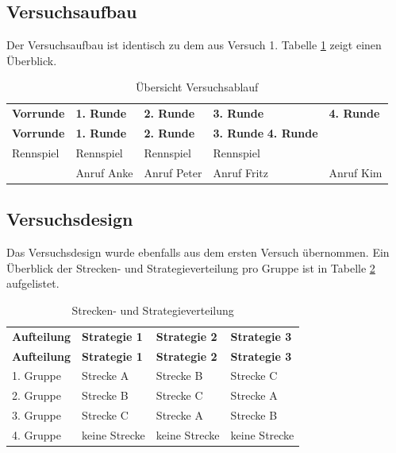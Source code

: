 \documentclass[12pt,a4paper]{scrartcl}
\begin{document}
\subsection{Versuchsaufbau}
Der Versuchsaufbau ist identisch zu dem aus Versuch 1.
Tabelle \ref{ablauf} zeigt einen Überblick.

\begin{longtable}{p{}p{}p{}p{}p{} }
	\label{ablauf}\\
	\caption[Übersicht Versuchsablauf]{Übersicht Versuchsablauf}\\
	\hline
	\textbf{Vorrunde}&\textbf{1. Runde}&\textbf{2. Runde} &\textbf{3. Runde} & \textbf{4. Runde}\\
	\hline
	\endfirsthead
	\hline
	\textbf{Vorrunde}&\textbf{1. Runde}&\textbf{2. Runde} &\textbf{3. Runde} \textbf{4. Runde}\\
	\hline
	\endhead
Rennspiel & Rennspiel & Rennspiel & Rennspiel &\\
 & Anruf Anke & Anruf Peter & Anruf Fritz & Anruf Kim \\
\hline
\end{longtable}

\subsection{Versuchsdesign}
Das Versuchsdesign wurde ebenfalls aus dem ersten Versuch übernommen.
Ein Überblick der Strecken- und Strategieverteilung pro Gruppe ist in Tabelle \ref{verteilung} aufgelistet. 

\begin{longtable}{p{3cm}p{3cm}p{3cm}p{3cm} }
	\label{verteilung}\\
	\caption[Strecken- und Strategieverteilung]{Strecken- und Strategieverteilung}\\
	\hline
	\textbf{Aufteilung}&\textbf{Strategie 1}&\textbf{Strategie 2} &\textbf{Strategie 3}\\
	\hline
	\endfirsthead
	\hline
	\textbf{Aufteilung}&\textbf{Strategie 1}&\textbf{Strategie 2} &\textbf{Strategie 3}\\
	\hline
	\endhead
1. Gruppe & Strecke A & Strecke B & Strecke C \\
2. Gruppe & Strecke B & Strecke C & Strecke A \\
3. Gruppe  & Strecke C & Strecke A & Strecke B \\
4. Gruppe   & keine Strecke & keine Strecke & keine Strecke\\ 
\hline
\end{longtable}
\end{document}
